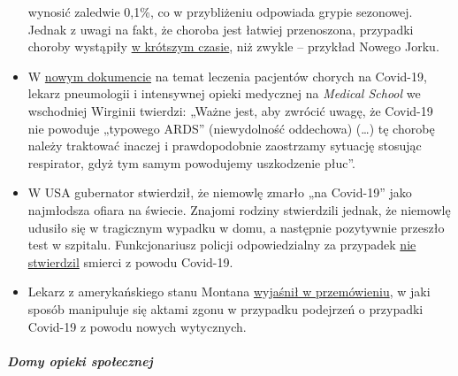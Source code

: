 \begin{itemize}
  wynosić zaledwie 0,1\%, co w przybliżeniu odpowiada grypie sezonowej.
  Jednak z uwagi na fakt, że choroba jest łatwiej przenoszona, przypadki
  choroby wystąpiły \href{https://archive.is/7w2XE}{w krótszym czasie},
  niż zwykle -- przykład Nowego Jorku.
\item
  W
  \href{https://www.evms.edu/media/evms_public/departments/internal_medicine/EVMS_Critical_Care_COVID-19_Protocol.pdf}{nowym
  dokumencie} na temat leczenia pacjentów chorych na Covid-19, lekarz
  pneumologii i intensywnej opieki medycznej na \emph{Medical School} we
  wschodniej Wirginii twierdzi: „Ważne jest, aby zwrócić uwagę, że
  Covid-19 nie powoduje „typowego ARDS'' (niewydolność oddechowa)
  (\ldots{}) tę chorobę należy traktować inaczej i prawdopodobnie
  zaostrzamy sytuację stosując respirator, gdyż tym samym powodujemy
  uszkodzenie płuc''.
\item
  W USA gubernator stwierdził, że niemowlę zmarło „na Covid-19'' jako
  najmłodsza ofiara na świecie. Znajomi rodziny stwierdzili jednak, że
  niemowlę udusiło się w tragicznym wypadku w domu, a następnie
  pozytywnie przeszło test w szpitalu. Funkcjonariusz policji
  odpowiedzialny za przypadek
  \href{https://www.dailymail.co.uk/news/article-8193487/Coroner-refuses-rule-COVID-19-cause-death-six-week-old-Connecticut-baby.html}{nie
  stwierdzil} smierci z powodu Covid-19.
\item
  Lekarz z amerykańskiego stanu Montana
  \href{https://www.youtube.com/watch?v=V0lIWZpiRU0}{wyjaśnił w
  przemówieniu}, w jaki sposób manipuluje się aktami zgonu w przypadku
  podejrzeń o przypadki Covid-19 z powodu nowych wytycznych.
\end{itemize}

\hypertarget{domy-opieki-spoux142ecznej}{%
\subparagraph{\texorpdfstring{\textbf{Domy opieki
społecznej}}{Domy opieki społecznej}}\label{domy-opieki-spoux142ecznej}}

